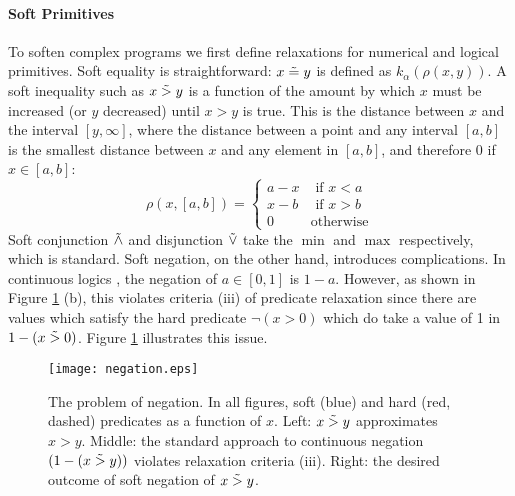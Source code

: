 


\paragraph{Soft Primitives}
To soften complex programs we first define relaxations for numerical and logical primitives.
Soft equality is straightforward: $x \mathrel{\tilde{=}} y$ is defined as $k_\alpha(\rho(x, y))$.
A soft inequality such as $x \mathrel{\tilde{>}} y$ is a function of the amount by which $x$ must be increased (or $y$ decreased) until $x > y$ is true.
This is the distance between $x$ and the interval $[y, \infty]$, where the distance between a point and any interval $[a, b]$ is the smallest distance between $x$ and any element in $[a, b]$, and therefore 0 if $x \in [a, b]$:
\begin{equation}
\rho(x, [a, b]) =
\begin{cases}
  a - x & \text{ if } x < a\\
  x - b & \text{ if } x > b\\
  0              & \text{otherwise}
\end{cases}
\end{equation}
Soft conjunction $\mathrel{\tilde{\land}}$ and disjunction $\mathrel{\tilde{\lor}}$ take the $\min$ and $\max$ respectively, which is standard.
Soft negation, on the other hand, introduces complications.
In continuous logics \cite{kimmig2012short}, the negation of $a \in [0, 1]$ is $1 - a$.
However, as shown in Figure \ref{negationimg} (b), this violates criteria (iii) of predicate relaxation since there are values which satisfy the hard predicate $\neg(x > 0)$ which do take a value of 1 in $1 - (x \mathrel{\tilde{>}} 0)$.
Figure \ref{negationimg} illustrates this issue.


\begin{figure}
\texttt{[image: negation.eps]}
\caption{The problem of negation.  In all figures, soft (blue) and hard (red, dashed) predicates as a function of $x$.  Left: $x \mathrel{\tilde{>}} y$ approximates $x > y$. Middle:  the standard approach to continuous negation $(1- (x \mathrel{\tilde{>}} y))$ violates relaxation criteria (iii). Right: the desired outcome of soft negation of $x \mathrel{\tilde{>}} y$.}\label{negationimg}
\end{figure}


